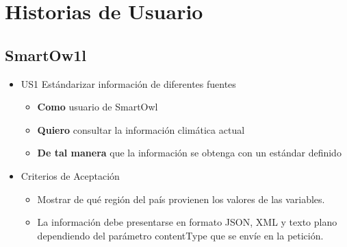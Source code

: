 %
%
\newpage
\section*{Historias de Usuario}
\subsection*{SmartOw1l}
\begin{itemize}
  \item US1 Estándarizar información de diferentes fuentes
  \begin{itemize}
    \item \textbf{Como} usuario de SmartOwl
    \item \textbf{Quiero} consultar la información climática actual
    \item \textbf{De tal manera} que la información se obtenga con un estándar definido
  \end{itemize}
  \item Criterios de Aceptación
  \begin{itemize}
    \item Mostrar de qué región del país provienen los valores de las variables.
    \item La información debe presentarse en formato JSON, XML y texto plano dependiendo del parámetro contentType que se envíe en la petición.
  \end{itemize}
\end{itemize}

